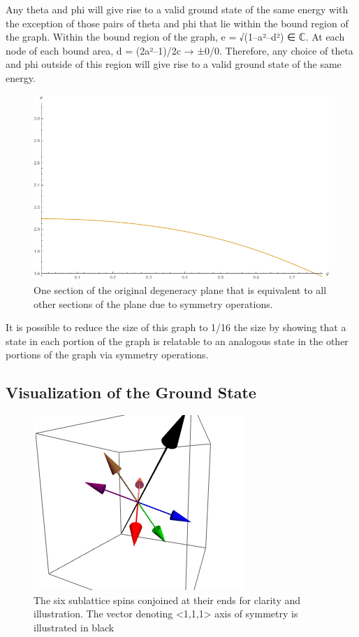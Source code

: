 Any theta and phi will give rise to a valid ground state of the same energy with the exception of those pairs of theta and phi that lie within the bound region of the graph. Within the bound region of the graph, e = √(1–a²–d²) ∈ ℂ. At each node of each bound area, d = (2a²–1)/2c → ±0/0. Therefore, any choice of theta and phi outside of this region will give rise to a valid ground state of the same energy.

\begin{figure}
	\includegraphics[width=\linewidth]{img/degeneracyplane.png}
	\caption{One section of the original degeneracy plane that is equivalent to all other sections of the plane due to symmetry operations.}
	\label{fig:degenplane}
\end{figure}

It is possible to reduce the size of this graph to 1/16 the size by showing that a state in each portion of the graph is relatable to an analogous state in the other portions of the graph via symmetry operations.
\clearpage

\subsection{Visualization of the Ground State}
\begin{figure}[ht]
	\includegraphics[scale=1.2]{img/samplegs.png}
	\caption{The six sublattice spins conjoined at their ends for clarity and illustration. The vector denoting <1,1,1> axis of symmetry is illustrated in black}
	\label{fig:sampgs}
\end{figure}


